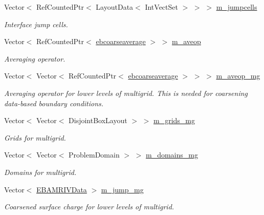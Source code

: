 \begin{DoxyCompactItemize}
Vector$<$ Ref\+Counted\+Ptr$<$ Layout\+Data$<$ Int\+Vect\+Set $>$ $>$ $>$ \hyperlink{classnwomfconductivityopfactory_a9cdcd3fd284db8f96c7195c286094ec7}{m\+\_\+jumpcells}
\begin{DoxyCompactList}\small\item\em Interface jump cells. \end{DoxyCompactList}\item 
Vector$<$ Ref\+Counted\+Ptr$<$ \hyperlink{classebcoarseaverage}{ebcoarseaverage} $>$ $>$ \hyperlink{classnwomfconductivityopfactory_a199fa63abcd726660bb78331b39e033e}{m\+\_\+aveop}
\begin{DoxyCompactList}\small\item\em Averaging operator. \end{DoxyCompactList}\item 
Vector$<$ Vector$<$ Ref\+Counted\+Ptr$<$ \hyperlink{classebcoarseaverage}{ebcoarseaverage} $>$ $>$ $>$ \hyperlink{classnwomfconductivityopfactory_a9f453f54d74ecd1eea960d338b6aaa07}{m\+\_\+aveop\+\_\+mg}
\begin{DoxyCompactList}\small\item\em Averaging operator for lower levels of multigrid. This is needed for coarsening data-\/based boundary conditions. \end{DoxyCompactList}\item 
Vector$<$ Vector$<$ Disjoint\+Box\+Layout $>$ $>$ \hyperlink{classnwomfconductivityopfactory_a823ba114bca6a6b83dbd38781ecf45ee}{m\+\_\+grids\+\_\+mg}
\begin{DoxyCompactList}\small\item\em Grids for multigrid. \end{DoxyCompactList}\item 
Vector$<$ Vector$<$ Problem\+Domain $>$ $>$ \hyperlink{classnwomfconductivityopfactory_a29cd4a27da466ce46911977c803f14bb}{m\+\_\+domains\+\_\+mg}
\begin{DoxyCompactList}\small\item\em Domains for multigrid. \end{DoxyCompactList}\item 
Vector$<$ \hyperlink{type__definitions_8H_a6b8fa905d55cbb491b52180386f0e0c1}{E\+B\+A\+M\+R\+I\+V\+Data} $>$ \hyperlink{classnwomfconductivityopfactory_aea2b14dc47f61b785fb83366005a432c}{m\+\_\+jump\+\_\+mg}
\begin{DoxyCompactList}\small\item\em Coarsened surface charge for lower levels of multigrid. \end{DoxyCompactList}\item 

\end{DoxyCompactItemize}
